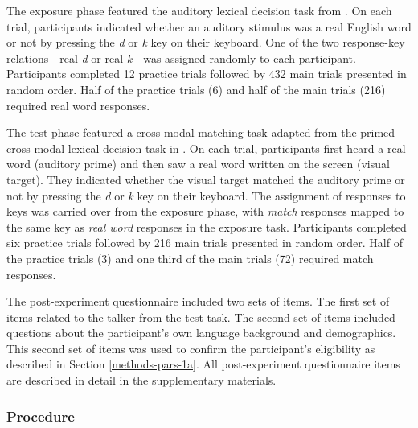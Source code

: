 \documentclass[preprint, 3p, authoryear]{elsarticle} %
\begin{document}
The exposure phase featured the auditory lexical decision task from \citet{xie2017similarity}.
On each trial, participants indicated whether an auditory stimulus was a real English word or not by pressing the \emph{d} or \emph{k} key on their keyboard.
One of the two response-key relations---real-\emph{d} or real-\emph{k}---was assigned randomly to each participant.
Participants completed 12 practice trials followed by 432 main trials presented in random order.
Half of the practice trials (6) and half of the main trials (216) required real word responses.

The test phase featured a cross-modal matching task adapted from the primed cross-modal lexical decision task in \citet{xie2017similarity}.
On each trial, participants first heard a real word (auditory prime) and then saw a real word written on the screen (visual target).
They indicated whether the visual target matched the auditory prime or not by pressing the \emph{d} or \emph{k} key on their keyboard.
The assignment of responses to keys was carried over from the exposure phase, with \emph{match} responses mapped to the same key as \emph{real word} responses in the exposure task.
Participants completed six practice trials followed by 216 main trials presented in random order.
Half of the practice trials (3) and one third of the main trials (72) required match responses.

The post-experiment questionnaire included two sets of items.
The first set of items related to the talker from the test task.
The second set of items included questions about the participant's own language background and demographics.
This second set of items was used to confirm the participant's eligibility as described in Section \ref{methods-pars-1a}.
All post-experiment questionnaire items are described in detail in the supplementary materials.

\hypertarget{methods-proc}{%
\subsubsection{Procedure}\label{methods-proc}}
\end{document}
